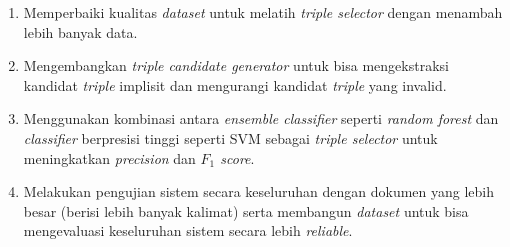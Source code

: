 \begin{enumerate}
	\item Memperbaiki kualitas \textit{dataset} untuk melatih \textit{triple selector} dengan menambah lebih banyak data.
	
	\item Mengembangkan \textit{triple candidate generator} untuk bisa mengekstraksi kandidat \textit{triple} implisit dan mengurangi kandidat \textit{triple} yang invalid.
	
	\item Menggunakan kombinasi antara \textit{ensemble classifier} seperti \textit{random forest} dan \textit{classifier} berpresisi tinggi seperti SVM sebagai \textit{triple selector} untuk meningkatkan \textit{precision} dan \textit{$F_1$ score}.
	
	\item Melakukan pengujian sistem secara keseluruhan dengan dokumen yang lebih besar (berisi lebih banyak kalimat) serta membangun \textit{dataset} untuk bisa mengevaluasi keseluruhan sistem secara lebih \textit{reliable}.
\end{enumerate}
